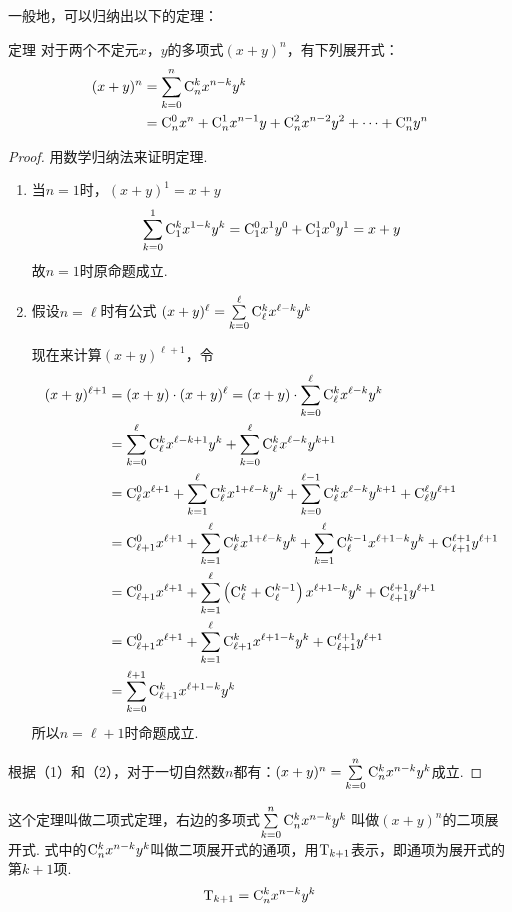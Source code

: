 一般地，可以归纳出以下的定理：
\begin{blk}
    {定理} 对于两个不定元$x$，$y$的多项式$(x+y)^n$，有下列展开式：
\[\begin{split}
    (x+y)^n&=\sum^n_{k=0}{\rm C}^{k}_{n}x^{n-k}y^k\\
    &={\rm C}^{0}_{n}x^n+{\rm C}^{1}_{n}x^{n-1}y+{\rm C}^{2}_{n}x^{n-2}y^2+\cdots+{\rm C}^{n}_{n}y^n
\end{split}\]
\end{blk}

\begin{proof}
    用数学归纳法来证明定理.
\begin{enumerate}[(1)]
    \item 当$n=1$时，$(x+y)^1=x+y$
\[\sum^1_{k=0}{\rm C}^{k}_{1}x^{1-k}y^k={\rm C}^{0}_{1}x^1y^0+{\rm C}^{1}_{1}x^{0}y^1=x+y\]
故$n=1$时原命题成立.
\item 假设$n=\ell$时有公式 $(x+y)^{\ell}=\sum\limits^\ell_{k=0}{\rm C}^{k}_{\ell}x^{\ell-k}y^k$

现在来计算$(x+y)^{\ell+1}$，令
\[\begin{split}
    (x+y)^{\ell+1}&=(x+y)\cdot (x+y)^{\ell}=(x+y)\cdot \sum^\ell_{k=0}{\rm C}^{k}_{\ell}x^{\ell-k}y^k\\
&=\sum^\ell_{k=0}{\rm C}^{k}_{\ell}x^{\ell-k+1}y^k +\sum^\ell_{k=0}{\rm C}^{k}_{\ell}x^{\ell-k}y^{k+1}\\
&={\rm C}^{0}_{\ell}x^{\ell+1}+\sum^\ell_{k=1}{\rm C}^{k}_{\ell}x^{1+\ell-k}y^k+\sum^{\ell-1}_{k=0}{\rm C}^{k}_{\ell}x^{\ell-k}y^{k+1}+{\rm C}^{\ell}_{\ell}y^{\ell+1}\\
&={\rm C}^{0}_{\ell+1}x^{\ell+1}+\sum^\ell_{k=1}{\rm C}^{k}_{\ell}x^{1+\ell-k}y^k+\sum^{\ell}_{k=1}{\rm C}^{k-1}_{\ell}x^{\ell+1-k}y^{k}+{\rm C}^{\ell+1}_{\ell+1}y^{\ell+1}\\
&={\rm C}^{0}_{\ell+1}x^{\ell+1}+\sum^\ell_{k=1}\left({\rm C}^{k}_{\ell}+{\rm C}^{k-1}_{\ell}\right)x^{\ell+1-k}y^k+{\rm C}^{\ell+1}_{\ell+1}y^{\ell+1}\\
&={\rm C}^{0}_{\ell+1}x^{\ell+1}+\sum^\ell_{k=1}{\rm C}^{k}_{\ell+1}x^{\ell+1-k}y^k +{\rm C}^{\ell+1}_{\ell+1}y^{\ell+1}\\
&=\sum^{\ell+1}_{k=0}{\rm C}^{k}_{\ell+1}x^{\ell+1-k}y^k 
\end{split} \]
所以$n=\ell+1$时命题成立.
\end{enumerate}
根据（1）和（2），对于一切自然数$n$都有：$(x+y)^n=\sum\limits^n_{k=0}{\rm C}^{k}_{n}x^{n-k}y^k$成立.
\end{proof}

这个定理叫做二项式定理，右边的多项式$\sum\limits^n_{k=0}{\rm C}^{k}_{n}x^{n-k}y^k$
叫做$(x+y)^n$的二项展开式. 式中的${\rm C}^{k}_{n}x^{n-k}y^k$叫做二项展开式的通项，用${\rm T}_{k+1}$表示，即通项为展开式的第$k+1$项.
\[{\rm T}_{k+1}={\rm C}^{k}_{n}x^{n-k}y^k\]

